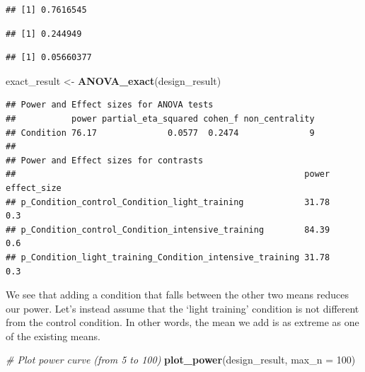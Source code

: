 \documentclass[]{book}
\newenvironment{Shaded}{\begin{snugshade}}{\end{snugshade}}
\newcommand{\CommentTok}[1]{\textcolor[rgb]{0.56,0.35,0.01}{\textit{#1}}}
\newcommand{\DataTypeTok}[1]{\textcolor[rgb]{0.13,0.29,0.53}{#1}}
\newcommand{\DecValTok}[1]{\textcolor[rgb]{0.00,0.00,0.81}{#1}}
\newcommand{\KeywordTok}[1]{\textcolor[rgb]{0.13,0.29,0.53}{\textbf{#1}}}
\newcommand{\NormalTok}[1]{#1}
\newcommand{\OperatorTok}[1]{\textcolor[rgb]{0.81,0.36,0.00}{\textbf{#1}}}
\newcommand{\StringTok}[1]{\textcolor[rgb]{0.31,0.60,0.02}{#1}}
\begin{document}
\begin{verbatim}
## [1] 0.7616545
\end{verbatim}

\begin{Shaded}
\end{Shaded}

\begin{verbatim}
## [1] 0.244949
\end{verbatim}

\begin{Shaded}
\end{Shaded}

\begin{verbatim}
## [1] 0.05660377
\end{verbatim}

\begin{Shaded}
\begin{Highlighting}[]
\NormalTok{exact_result <-}\StringTok{ }\KeywordTok{ANOVA_exact}\NormalTok{(design_result)}
\end{Highlighting}
\end{Shaded}

\begin{verbatim}
## Power and Effect sizes for ANOVA tests
##           power partial_eta_squared cohen_f non_centrality
## Condition 76.17              0.0577  0.2474              9
## 
## Power and Effect sizes for contrasts
##                                                         power effect_size
## p_Condition_control_Condition_light_training            31.78         0.3
## p_Condition_control_Condition_intensive_training        84.39         0.6
## p_Condition_light_training_Condition_intensive_training 31.78         0.3
\end{verbatim}

We see that adding a condition that falls between the other two means reduces our power. Let's instead assume that the `light training' condition is not different from the control condition. In other words, the mean we add is as extreme as one of the existing means.

\begin{Shaded}
\begin{Highlighting}[]
\CommentTok{# Plot power curve (from 5 to 100)}
\KeywordTok{plot_power}\NormalTok{(design_result, }\DataTypeTok{max_n =} \DecValTok{100}\NormalTok{)}
\end{Highlighting}
\end{Shaded}
\end{document}
